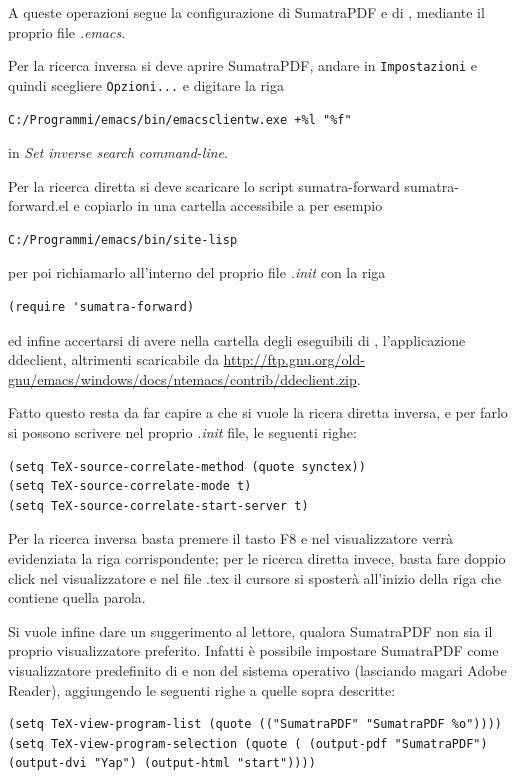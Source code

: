 \documentclass[11pt,a4paper]{article}
\begin{document}
A queste operazioni segue la configurazione di SumatraPDF e di \emacs,
mediante il proprio file \emph{.emacs}.

Per la ricerca inversa si deve aprire SumatraPDF, andare in
\texttt{Impostazioni} e quindi scegliere \texttt{Opzioni...} e
digitare la riga
\begin{Verbatim}
C:/Programmi/emacs/bin/emacsclientw.exe +%l "%f"
\end{Verbatim}
in \emph{Set inverse search command-line}.

Per la ricerca diretta si deve scaricare lo script
sumatra-forward %
{sumatra-forward.el} %
e copiarlo in una cartella accessibile a \emacs{} per esempio
\begin{Verbatim}
C:/Programmi/emacs/bin/site-lisp
\end{Verbatim}
 per poi richiamarlo all'interno del proprio file \emph{.init} con la riga
\begin{Verbatim}
(require 'sumatra-forward)
\end{Verbatim}
ed infine accertarsi di avere nella cartella degli eseguibili di
\emacs, l'applicazione \textsf{ddeclient}, altrimenti scaricabile da %
\url{http://ftp.gnu.org/old-gnu/emacs/windows/docs/ntemacs/contrib/ddeclient.zip}.

Fatto questo resta da far capire a \emacs{} che si vuole la ricera
diretta inversa, e per farlo si possono scrivere nel proprio
\emph{.init} file, le seguenti righe:
\begin{Verbatim}
(setq TeX-source-correlate-method (quote synctex))
(setq TeX-source-correlate-mode t)
(setq TeX-source-correlate-start-server t)
\end{Verbatim}

Per la ricerca inversa basta premere il tasto \textsf{F8} e nel visualizzatore
verrà evidenziata la riga corrispondente; per le ricerca diretta invece, basta
fare doppio click nel visualizzatore e nel file .tex il cursore si sposterà
all'inizio della riga che contiene quella parola.

Si vuole infine dare un suggerimento al lettore, qualora
\textsf{SumatraPDF} non sia il proprio visualizzatore
preferito. Infatti è possibile impostare \textsf{SumatraPDF} come
visualizzatore predefinito di \emacs{} e non del sistema operativo
(lasciando magari \textsf{Adobe Reader}), aggiungendo le seguenti
righe a quelle sopra descritte:
\begin{Verbatim}
(setq TeX-view-program-list (quote (("SumatraPDF" "SumatraPDF %o"))))
(setq TeX-view-program-selection (quote ( (output-pdf "SumatraPDF")
(output-dvi "Yap") (output-html "start"))))
\end{Verbatim}
\end{document}
